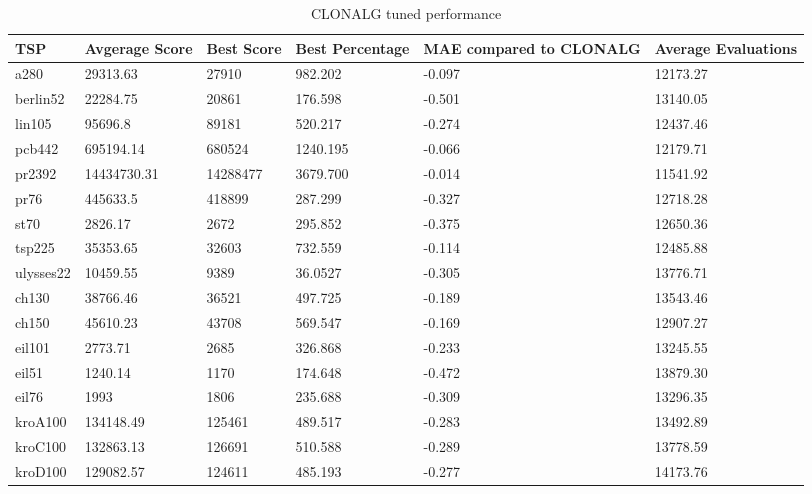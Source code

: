 \begin{table}[H]
	\begin{tabular}{|l|l|l|l|p{2.5cm}|p{2cm}|}
		\hline
		TSP       & Avgerage Score & Best Score & Best Percentage    &\textbf{ MAE compared to CLONALG} & Average Evaluations  \\ \hline
		a280      & 29313.63    & 27910     & 982.202  & -0.097                                                     & 12173.27 \\ \hline
		berlin52  & 22284.75    & 20861     & 176.598 & -0.501                                                    & 13140.05 \\ \hline
		lin105    & 95696.8     & 89181     & 520.217 & -0.274                                                    & 12437.46 \\ \hline
		pcb442    & 695194.14   & 680524    & 1240.195 & -0.066                                                    & 12179.71 \\ \hline
		pr2392    & 14434730.31 & 14288477  & 3679.700 & -0.014                                                   & 11541.92 \\ \hline
		pr76      & 445633.5    & 418899    & 287.299 & -0.327                                                    & 12718.28 \\ \hline
		st70      & 2826.17     & 2672      & 295.852 & -0.375                                                    & 12650.36 \\ \hline
		tsp225    & 35353.65    & 32603     & 732.559 & -0.114                                                    & 12485.88 \\ \hline
		ulysses22 & 10459.55    & 9389      & 36.0527 & -0.305                                                    & 13776.71 \\ \hline
		ch130     & 38766.46    & 36521     & 497.725 & -0.189                                                    & 13543.46 \\ \hline
		ch150     & 45610.23    & 43708     & 569.547 & -0.169                                                    & 12907.27 \\ \hline
		eil101    & 2773.71     & 2685      & 326.868 & -0.233                                                    & 13245.55 \\ \hline
		eil51     & 1240.14     & 1170      & 174.648 & -0.472                                                    & 13879.30 \\ \hline
		eil76     & 1993        & 1806      & 235.688 & -0.309                                                    & 13296.35 \\ \hline
		kroA100   & 134148.49   & 125461    & 489.517 & -0.283                                                    & 13492.89 \\ \hline
		kroC100   & 132863.13   & 126691    & 510.588 & -0.289                                                    & 13778.59 \\ \hline
		kroD100   & 129082.57   & 124611    & 485.193 & -0.277                                                    & 14173.76 \\ \hline
	\end{tabular}
	\caption{CLONALG tuned performance}
	\label{tab:clonalg_tuned}
\end{table}
